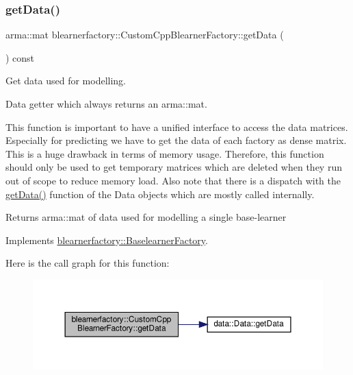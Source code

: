 \subsubsection{\texorpdfstring{get\+Data()}{getData()}}
{\footnotesize\ttfamily arma\+::mat blearnerfactory\+::\+Custom\+Cpp\+Blearner\+Factory\+::get\+Data (\begin{DoxyParamCaption}{ }\end{DoxyParamCaption}) const\hspace{0.3cm}{\ttfamily [virtual]}}



Get data used for modelling. 

Data getter which always returns an arma\+::mat.

This function is important to have a unified interface to access the data matrices. Especially for predicting we have to get the data of each factory as dense matrix. This is a huge drawback in terms of memory usage. Therefore, this function should only be used to get temporary matrices which are deleted when they run out of scope to reduce memory load. Also note that there is a dispatch with the \hyperlink{classblearnerfactory_1_1_custom_cpp_blearner_factory_a29cc0d142660d6e52245c264f71dd651}{get\+Data()} function of the Data objects which are mostly called internally.

\begin{DoxyReturn}{Returns}
{\ttfamily arma\+::mat} of data used for modelling a single base-\/learner 
\end{DoxyReturn}


Implements \hyperlink{classblearnerfactory_1_1_baselearner_factory_aa3e4580bca870ca3b742dda6c820e1e6}{blearnerfactory\+::\+Baselearner\+Factory}.

Here is the call graph for this function\+:
\nopagebreak
\begin{figure}[H]
\begin{center}
\leavevmode
\includegraphics[width=350pt]{classblearnerfactory_1_1_custom_cpp_blearner_factory_a29cc0d142660d6e52245c264f71dd651_cgraph}
\end{center}
\end{figure}
\mbox{\label{classblearnerfactory_1_1_custom_cpp_blearner_factory_abc9c251017197087af3ef8a1c0421969}} 
